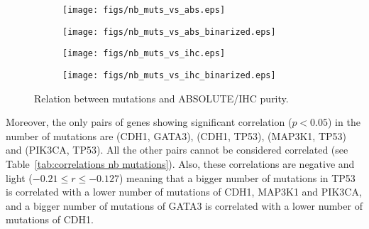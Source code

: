 \documentclass[letterpaper]{article}
\begin{document}
\begin{figure*}[!t]
\begin{subfigure}{.49\textwidth}
\vspace{-.75cm}
\hspace{-.5cm}
\texttt{[image: figs/nb\_muts\_vs\_abs.eps]}
\vspace{-1cm}
\end{subfigure}
\begin{subfigure}{.49\textwidth}
\vspace{-.75cm}
\texttt{[image: figs/nb\_muts\_vs\_abs\_binarized.eps]}
\vspace{-1cm}
\end{subfigure}
\begin{subfigure}{.49\textwidth}
\vspace{-.75cm}
\hspace{-.5cm}
\texttt{[image: figs/nb\_muts\_vs\_ihc.eps]}
\vspace{-1cm}
\end{subfigure}
\begin{subfigure}{.49\textwidth}
\vspace{-.75cm}
\texttt{[image: figs/nb\_muts\_vs\_ihc\_binarized.eps]}
\vspace{-1cm}
\end{subfigure}
\caption{Relation between mutations and ABSOLUTE/IHC purity.}
\end{figure*}

Moreover, the only pairs of genes showing significant correlation ($p < 0.05$) in the number of mutations are (CDH1, GATA3), (CDH1, TP53), (MAP3K1, TP53)
and (PIK3CA, TP53). All the other pairs cannot be considered correlated (see Table~\ref{tab:correlations nb mutations}). Also, these correlations are negative and light
($-0.21 \leq r \leq -0.127$) meaning that a bigger number of mutations in TP53 is correlated with a lower number of mutations of CDH1, MAP3K1 and PIK3CA, and a
bigger number of mutations of GATA3 is correlated with a lower number of mutations of CDH1.
\end{document}
